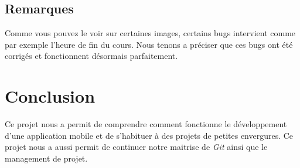 \documentclass{article}
\begin{document}
          \subsection{Remarques}
          Comme vous pouvez le voir sur certaines images, certains bugs intervient comme par exemple l'heure de fin du cours. Nous tenons a pr\'eciser que ces bugs ont \'et\'e corrig\'es et fonctionnent d\'esormais parfaitement.

    \section{Conclusion}
        Ce projet nous a permit de comprendre comment fonctionne le développement d'une application
        mobile et de s'habituer à des projets de petites envergures. Ce projet nous a aussi permit
        de continuer notre maitrise de \textit{Git} ainsi que le management de projet.
\end{document}
